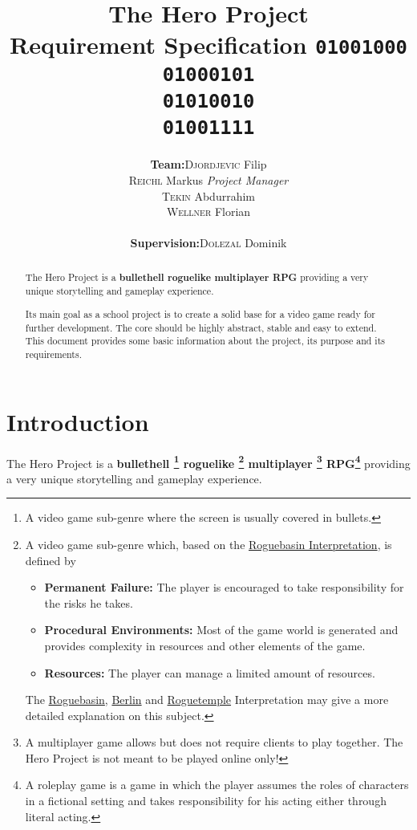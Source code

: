 \documentclass[11pt]{article}
\title{
  \textbf{The Hero Project}\\
  \large{Requirement Specification}
  \linebreak
  \linebreak
  \small{\texttt{01001000\\01000101\\01010010\\01001111}}
}
\author{
  \begin{tabular}{rl}
    \textbf{Team:}
    & \textsc{Djordjevic} Filip\\
    & \textsc{Reichl} Markus \small{\textit{Project Manager}}\\
    & \textsc{Tekin} Abdurrahim\\
    & \textsc{Wellner} Florian\\
    \\
    \textbf{Supervision:}
    & \textsc{Dolezal} Dominik
  \end{tabular}
}
\begin{document}
\begin{titlepage}
  \clearpage
  \maketitle
  \thispagestyle{empty}
  
  \begin{abstract}
    \begin{flushleft}
      The Hero Project is a \textbf{bullethell roguelike multiplayer RPG} providing a very unique storytelling and gameplay experience.
      
      Its main goal as a school project is to create a solid base for a video game ready for further development. The core should be highly abstract, stable and easy to extend.
      \linebreak
      \linebreak
      This document provides some basic information about the project, its purpose and its requirements.
     \end{flushleft}
  \end{abstract}
\end{titlepage}

\tableofcontents
\newpage

\section{Introduction}
The Hero Project is a \textbf{
  bullethell
  \footnote{A video game sub-genre where the screen is usually covered in bullets.}
  roguelike
  \footnote{A video game sub-genre which, based on the \href{http://roguebasin.com/roguelike-definition}{Roguebasin Interpretation}, is defined by 
    \begin{itemize}
      \item \textbf{Permanent Failure:} The player is encouraged to take responsibility for the risks he takes.
      \item \textbf{Procedural Environments:} Most of the game world is generated and provides complexity in resources and other elements of the game.
      \item \textbf{Resources:} The player can manage a limited amount of resources.
    \end{itemize}
    The \href{http://roguebasin.com/roguelike-definition}{Roguebasin}, \href{http://roguebasin.com/index.php?title=Berlin_Interpretation}{Berlin} and \href{http://roguetemple.com/roguelike-definition}{Roguetemple} Interpretation may give a more detailed explanation on this subject.
  }
  multiplayer
  \footnote{A multiplayer game allows but does not require clients to play together. The Hero Project is not meant to be played online only!}
  RPG\footnote{A roleplay game is a game in which the player assumes the roles of characters in a fictional setting and takes responsibility for his acting either through literal acting.}
} providing a very unique storytelling and gameplay experience.
\end{document}
